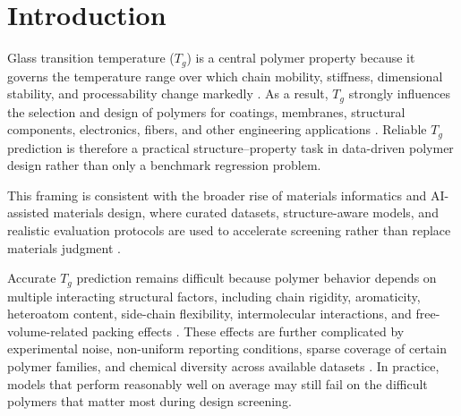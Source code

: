 \documentclass[review,12pt]{elsarticle}
\begin{document}
\section{Introduction}

Glass transition temperature ($T_g$) is a central polymer property because it governs the temperature range over which chain mobility, stiffness, dimensional stability, and processability change markedly \cite{tao2021benchmarking,xie2020glass}. As a result, $T_g$ strongly influences the selection and design of polymers for coatings, membranes, structural components, electronics, fibers, and other engineering applications \cite{audus2017polymer,tao2021benchmarking}. Reliable $T_g$ prediction is therefore a practical structure--property task in data-driven polymer design rather than only a benchmark regression problem.

This framing is consistent with the broader rise of materials informatics and AI-assisted materials design, where curated datasets, structure-aware models, and realistic evaluation protocols are used to accelerate screening rather than replace materials judgment \cite{ramprasad2017materialsinformatics,butler2018machinelearning,geurts2019datadriven,chen2021currentstatus,morand2024structureguided}.

Accurate $T_g$ prediction remains difficult because polymer behavior depends on multiple interacting structural factors, including chain rigidity, aromaticity, heteroatom content, side-chain flexibility, intermolecular interactions, and free-volume-related packing effects \cite{xie2020glass,park2022prediction,white2016freevolume}. These effects are further complicated by experimental noise, non-uniform reporting conditions, sparse coverage of certain polymer families, and chemical diversity across available datasets \cite{tao2021benchmarking,tang2025assessing,heid2023characterizing}. In practice, models that perform reasonably well on average may still fail on the difficult polymers that matter most during design screening.
\end{document}
